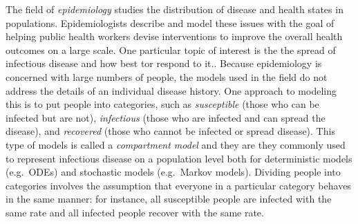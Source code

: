 \documentclass[
]{book}
\theoremstyle{definition}
\theoremstyle{definition}
\theoremstyle{definition}
\theoremstyle{remark}
\begin{document}
\label{sec:bio16}

The field of \emph{epidemiology} studies the distribution of disease and health states in populations. Epidemiologists describe and model these issues with the goal of helping public health workers devise interventions to improve the overall health outcomes on a large scale. One particular topic of interest is the the spread of infectious disease and how best tor respond to it.. Because epidemiology is concerned with large numbers of people, the models used in the field do not address the details of an individual disease history. One approach to modeling this is to put people into categories, such as \emph{susceptible} (those who can be infected but are not), \emph{infectious} (those who are infected and can spread the disease), and \emph{recovered} (those who cannot be infected or spread disease). This type of models is called a  \emph{compartment model} and they are they commonly used to represent infectious disease on a population level both for deterministic models (e.g.~ODEs) and stochastic models (e.g.~Markov models). Dividing people into categories involves the assumption that everyone in a particular category behaves in the same manner: for instance, all susceptible people are infected with the same rate and all infected people recover with the same rate.
\end{document}
